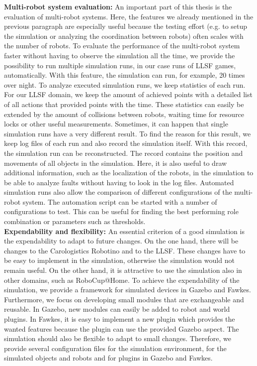 \textbf{Multi-robot system evaluation:} An important part of this thesis is the evaluation of multi-robot systems. Here, the features we already mentioned in the previous paragraph are especially useful because the testing effort (e.g. to setup the simulation or analyzing the coordination between robots) often scales with the number of robots. To evaluate the performance of the multi-robot system faster without having to observe the simulation all the time, we provide the possibility to run multiple simulation runs, in our case runs of LLSF games, automatically. With this feature, the simulation can run, for example, 20 times over night. To analyze executed simulation runs, we keep statistics of each run. For our LLSF domain, we keep the amount of achieved points with a detailed list of all actions that provided points with the time. These statistics can easily be extended by the amount of collisions between robots, waiting time for resource locks or other useful measurements. Sometimes, it can happen that single simulation runs have a very different result. To find the reason for this result, we keep log files of each run and also record the simulation itself. With this record, the simulation run can be reconstructed. The record contains the position and movements of all objects in the simulation. Here, it is also useful to draw additional information, such as the localization of the robots, in the simulation to be able to analyze faults without having to look in the log files. Automated simulation runs also allow the comparison of different configurations of the multi-robot system. The automation script can be started with a number of configurations to test. This can be useful for finding the best performing role combination or parameters such as thresholds.\\
\textbf{Expendability and flexibility:} An essential criterion of a good simulation is the expendability to adapt to future changes. On the one hand, there will be changes to the Carologistics Robotino and to the LLSF. These changes have to be easy to implement in the simulation, otherwise the simulation would not remain useful. On the other hand, it is attractive to use the simulation also in other domains, such as RoboCup@Home. To achieve the expendability of the simulation, we provide a framework for simulated devices in Gazebo and Fawkes. Furthermore, we focus on developing small modules that are exchangeable and reusable. In Gazebo, new modules can easily be added to robot and world plugins. In Fawkes, it is easy to implement a new plugin which provides the wanted features because the plugin can use the provided Gazebo aspect. The simulation should also be flexible to adapt to small changes. Therefore, we provide several configuration files for the simulation environment, for the simulated objects and robots and for plugins in Gazebo and Fawkes.\\
